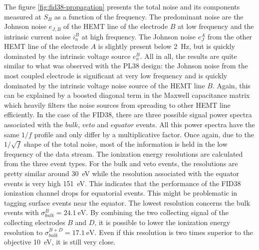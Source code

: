 The figure \ref{fig:fid38-propagation} presents the total noise and its components measured at $S_B$ as a function of the frequency. The predominant noise are the Johnson noise $e_{J,B}$ of the HEMT line of the electrode $B$ at low frequency and the intrinsic current noise $i_n^B$ at high frequency. The Johnson noise $e_J^A$ from the other HEMT line of the electrode $A$ is slightly present below \SI{2}{\Hz}, but is quickly dominated by the intrinsic voltage source $e_n^B$. All in all, the results are quite similar to what was observed with the PL38 design: the Johnson noise from the most coupled electrode is significant at very low frequency and is quickly dominated by the intrinsic voltage noise source of the HEMT line $B$. Again, this can be explained by a boosted diagonal term in the Maxwell capacitance matrix which heavily filters the noise sources from spreading to other HEMT line efficiently.
In the case of the FID38, there are three possible signal power spectra associated with the $bulk$, $veto$ and $equator$ events. All this power spectra have the same $1/f$ profile and only differ by a multiplicative factor.
Once again, due to the $1/\sqrt{f}$ shape of the total noise, most of the information is held in the low frequency of the data stream. The ionization energy resolutions are calculated from the three event types. For the bulk and veto events, the resolutions are pretty similar around \SI{30}{\eV} while the resolution associated with the equator events is very high \SI{151}{\eV}. This indicates that the performance of the FID38 ionization channel drops for equatorial events. This might be problematic in tagging surface events near the equator. The lowest resolution concerns the bulk events with $\sigma_{bulk}^B = \SI{24.1}{\eV}$. By combining the two collecting signal of the collecting electrodes $B$ and $D$, it is possible to lower the ionization energy resolution to  $\sigma_{bulk}^{B+D} = \SI{17.1}{\eV}$. Even if this resolution is two times superior to the objective \SI{10}{\eV}, it is still very close.

